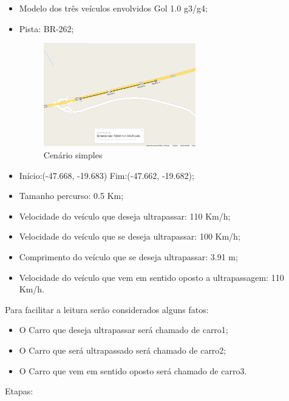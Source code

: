 \begin{itemize}
	\item Modelo dos três veículos envolvidos Gol 1.0 g3/g4;
	\item Pista: BR-262;
	
\begin{figure}[h]
  \centering
  \includegraphics[width=250px, scale=1]{figuras/modelo_pista}
  \caption{Cenário simples}
\label{fig:modelo_pista}
\end{figure}

	\item Início:(-47.668, -19.683) Fim:(-47.662, -19.682);
	\item Tamanho percurso: 0.5 Km;
	\item Velocidade do veículo que deseja ultrapassar: 110 Km/h;
	\item Velocidade do veículo que se deseja ultrapassar: 100 Km/h;
	\item Comprimento do veículo que se deseja ultrapassar: 3.91 m;
	\item Velocidade do veículo que vem em sentido oposto a ultrapassagem: 110 Km/h.
\end{itemize}
	
	
Para facilitar a leitura serão considerados alguns fatos: 

\begin{itemize}
	\item O Carro que deseja ultrapassar será chamado de carro1;
	\item O Carro que será ultrapassado será chamado de carro2;
	\item O Carro que vem em sentido oposto será chamado de carro3.
\end{itemize}

Etapas:

